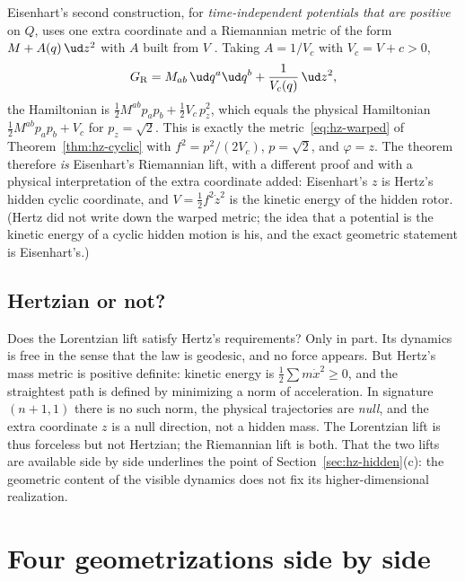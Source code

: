 Eisenhart's second construction, for \emph{time-independent potentials that are positive} on $Q$,
uses one extra coordinate and a Riemannian metric of the form
$M+A(q)\,\ud z^2$ with $A$ built from $V$
\cite{hdp:eisenhart1929,hdp:casetti2000}. Taking $A=1/V_c$ with $V_c=V+c>0$,
\begin{equation}\label{eq:hz-eis-riem}
  G_{\rm R}=M_{ab}\,\ud q^a\ud q^b+\frac{1}{V_c(q)}\,\ud z^2 ,
\end{equation}
the Hamiltonian is $\tfrac12M^{ab}p_ap_b+\tfrac12V_c\,p_z^2$, which equals
the physical Hamiltonian $\tfrac12M^{ab}p_ap_b+V_c$ for $p_z=\sqrt2$. This is exactly
the metric~\eqref{eq:hz-warped} of Theorem~\ref{thm:hz-cyclic} with $f^2=p^2/(2V_c)$, $p=\sqrt2$,
and $\varphi=z$. The theorem therefore \emph{is} Eisenhart's Riemannian lift, with a different proof and with
a physical interpretation of the extra coordinate added: Eisenhart's $z$ is Hertz's hidden
cyclic coordinate, and $V=\tfrac12f^2\dot z^2$ is the kinetic energy of the hidden rotor.
(Hertz did not write down the warped metric; the idea that a potential is the kinetic energy of
a cyclic hidden motion is his, and the exact geometric statement is Eisenhart's.)

\subsection{Hertzian or not?}

Does the Lorentzian lift satisfy Hertz's requirements? Only in part. Its dynamics is
free in the sense that the law is geodesic, and no force appears. But Hertz's mass metric is positive
definite: kinetic energy is $\tfrac12\sum m\dot x^2\ge0$, and the straightest path is defined by minimizing
a norm of acceleration. In signature $(n{+}1,1)$ there is no such norm, the physical
trajectories are \emph{null}, and the extra coordinate $z$ is a null direction, not a hidden mass.
The Lorentzian lift is thus forceless but not Hertzian; the Riemannian lift is both.
That the two lifts are available side by side underlines the point of
Section~\ref{sec:hz-hidden}(c): the geometric content of the visible dynamics does not fix its higher-dimensional
realization.

\section{Four geometrizations side by side}
\label{sec:hz-compare}

